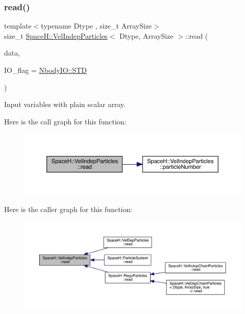 \subsubsection{\texorpdfstring{read()}{read()}}
{\footnotesize\ttfamily template$<$typename Dtype , size\+\_\+t Array\+Size$>$ \\
size\+\_\+t \mbox{\hyperlink{class_space_h_1_1_vel_indep_particles}{Space\+H\+::\+Vel\+Indep\+Particles}}$<$ Dtype, Array\+Size $>$\+::read (\begin{DoxyParamCaption}\item[{const \mbox{\hyperlink{class_space_h_1_1_vel_indep_particles_abca40159a816385790d5a6fd19c1dc6d}{Scalar\+Buffer}} \&}]{data,  }\item[{const \mbox{\hyperlink{namespace_space_h_a296a8bae763a754564bfdce216e31b59}{Nbody\+IO}}}]{I\+O\+\_\+flag = {\ttfamily \mbox{\hyperlink{namespace_space_h_a296a8bae763a754564bfdce216e31b59ac6ce23be5d350ce18a665427d2d950f7}{Nbody\+I\+O\+::\+S\+TD}}} }\end{DoxyParamCaption})\hspace{0.3cm}{\ttfamily [inline]}}



Input variables with plain scalar array. 

Here is the call graph for this function\+:
\nopagebreak
\begin{figure}[H]
\begin{center}
\leavevmode
\includegraphics[width=350pt]{class_space_h_1_1_vel_indep_particles_a46af27fe0ad3ef6789ead80cbe9cf1e9_cgraph}
\end{center}
\end{figure}
Here is the caller graph for this function\+:
\nopagebreak
\begin{figure}[H]
\begin{center}
\leavevmode
\includegraphics[width=350pt]{class_space_h_1_1_vel_indep_particles_a46af27fe0ad3ef6789ead80cbe9cf1e9_icgraph}
\end{center}
\end{figure}
\mbox{\label{class_space_h_1_1_vel_indep_particles_acfc418ed2bc892b9932c606853570e77}} 
